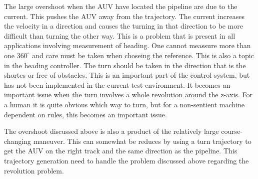 		The large overshoot when the AUV have located the pipeline are due to the current. This
		pushes the AUV away from the trajectory. The current increases the velocity in a direction and
		causes the turning in that direction to be more difficult than turning the other way. This is
		a problem that is present in all applications involving measurement of heading. One cannot
		meassure more than one $360^\circ$ and care must be taken when choseing the reference. This is
		also a topic in the heading controller. The turn should be taken in the direction that is the
		shortes or free of obstacles. This is an important part of the control system, but has not
		been implemented in the current test environment. It becomes an important issue when the turn
		involves a whole revolution around the z-axis. For a human it is quite obvious which way to
		turn, but for a non-sentient machine dependent on rules, this becomes an important issue. 

		The overshoot discussed above is also a product of the relatively large course-changing
		maneuver. This can somewhat be reduces by using a turn trajectory to get the AUV on the right
		track and the same direction as the pipeline. This trajectory generation need to handle the problem
		discussed above regarding the revolution problem.
		
